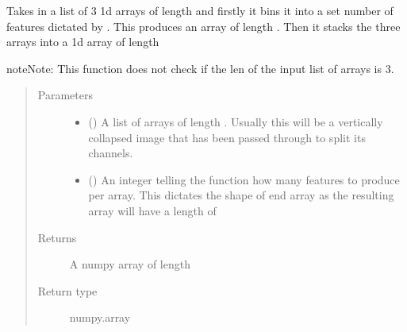 \documentclass[letterpaper,10pt,english]{sphinxmanual}
\begin{document}
\begin{fulllineitems}
\label{\detokenize{api:readpyne.core.binit}}
Takes in a list of 3 1d arrays of length  and firstly it bins it
into a set number of features dictated by . This produces
an array of length . Then it stacks the three arrays
into a 1d array of length 

\begin{sphinxadmonition}{note}{Note:}
This function does not check if the len of the input list of arrays is 3.
\end{sphinxadmonition}
\begin{quote}\begin{description}
\item[{Parameters}] \leavevmode\begin{itemize}
\item {} 
 () \textendash{} A list of arrays of length . Usually this will be a vertically
collapsed image that has been passed through  to split its
channels.

\item {} 
 () \textendash{} An integer telling the function how many features to produce per array.
This dictates the shape of end array as the resulting array will have a
length of 

\end{itemize}

\item[{Returns}] \leavevmode
A numpy array of length 

\item[{Return type}] \leavevmode
numpy.array

\end{description}\end{quote}

\end{fulllineitems}

\end{document}
